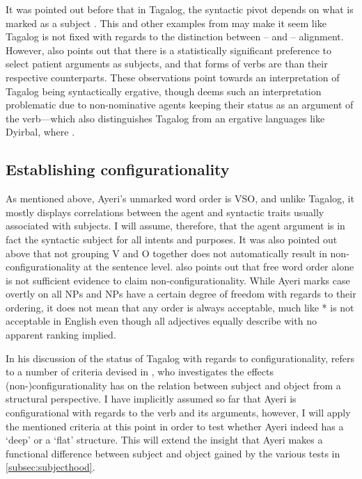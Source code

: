 It was pointed out before that in Tagalog, the syntactic pivot depends on what
is marked as a subject \citep[30--31]{kroeger1991}. This and other examples
from \citet{kroeger1991} may make it seem like Tagalog is not fixed with
regards to the distinction between \Nom{}--\Acc{} and \Erg{}--\Abs{} alignment.
However, \citet{kroeger1991} also points out that there is a statistically
significant preference to select patient arguments as subjects, and that \Ov{}
forms of verbs are  than their respective \Av{} counterparts. These observations
point towards an interpretation of Tagalog being syntactically ergative, though
\citet{kroeger1991} deems such an interpretation problematic due to
non-nominative agents keeping their status as an argument of the verb---which
also distinguishes Tagalog from an ergative languages like Dyirbal, where
.

\subsection{Establishing configurationality}
\label{subsec:config}

As mentioned above, Ayeri's unmarked word order is VSO, and unlike Tagalog, it
mostly displays correlations between the agent and syntactic traits usually
associated with subjects. I will assume, therefore, that the agent argument is
in fact the syntactic subject for all intents and purposes. It was also pointed
out above that not grouping V and O together does not automatically result in
non-configurationality at the sentence level. \citet[128]{speas1990} also
points out that free word order alone is not sufficient evidence to claim
non-configurationality. While Ayeri marks case overtly on all NPs and NPs have
a certain degree of freedom with regards to their ordering, it does not mean
that any order is always acceptable, much like * is not acceptable in English even though all adjectives equally
describe  with no apparent ranking implied.

In his discussion of the status of Tagalog with regards to configurationality,
\citet{kroeger1991} refers to a number of criteria devised in
\citet{speas1990}, who investigates the effects (non-)configurationality has on
the relation between subject and object from a structural perspective. I have
implicitly assumed so far that Ayeri is configurational with regards to the
verb and its arguments, however, I will apply the mentioned criteria at this
point in order to test whether Ayeri indeed has a `deep' or a `flat' structure.
This will extend the insight that Ayeri makes a functional difference between
subject and object gained by the various tests in \autoref{subsec:subjecthood}.

